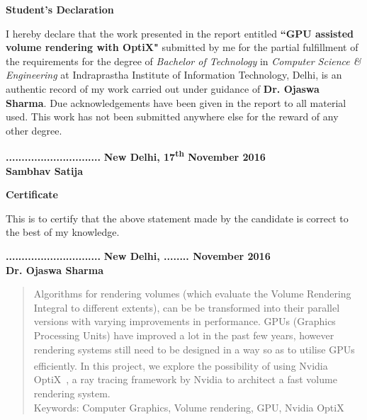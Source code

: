 \documentclass[letterpaper,11pt]{report}
\def\optix{Nvidia\textsuperscript{\textregistered} OptiX\texttrademark\ }
\begin{document}


%

\newpage

\begin{center}
\textbf{\Large Student's Declaration}\label{section:declaration}
\end{center}
I hereby declare that the work presented in the report entitled \textbf{``GPU assisted volume rendering with OptiX"} submitted by me for the partial fulfillment of the requirements for the degree of \emph{Bachelor of Technology} in \emph{Computer Science \& Engineering} at
 Indraprastha Institute of Information Technology, Delhi, is an authentic record of my work carried out under guidance of \textbf{Dr. Ojaswa Sharma}. Due acknowledgements have  been given in the report to all material used. This work has not been submitted anywhere else for the reward of any other degree.
 \\ \vspace{0.5in}

\textbf{..............................}\hfill
\textbf{New Delhi, 17\textsuperscript{th} November 2016} \\
\textbf{Sambhav Satija}\\




\vspace{3in}
\begin{center}
\textbf{\Large Certificate} \label{section:certificate}
\end{center}
This is to certify that the above statement made by the candidate is correct to the best of my knowledge.
 \\ \vspace{0.4in}

\textbf{..............................}\hfill
\textbf{New Delhi, ........ November 2016} \\
\textbf{Dr. Ojaswa Sharma}\\



\pagebreak

\begin{abstract}
Algorithms for rendering volumes (which evaluate the Volume Rendering Integral to different extents), can be be transformed into their parallel versions with varying improvements in performance. GPUs (Graphics Processing Units) have improved a lot in the past few years, however rendering systems still need to be designed in a way so as to utilise GPUs efficiently. In this project, we explore the possibility of using \optix, a ray tracing framework by Nvidia to architect a fast volume rendering system.
  \\

\vspace{2in}
Keywords: Computer Graphics, Volume rendering, GPU, Nvidia OptiX
\end{abstract}
\end{document}
